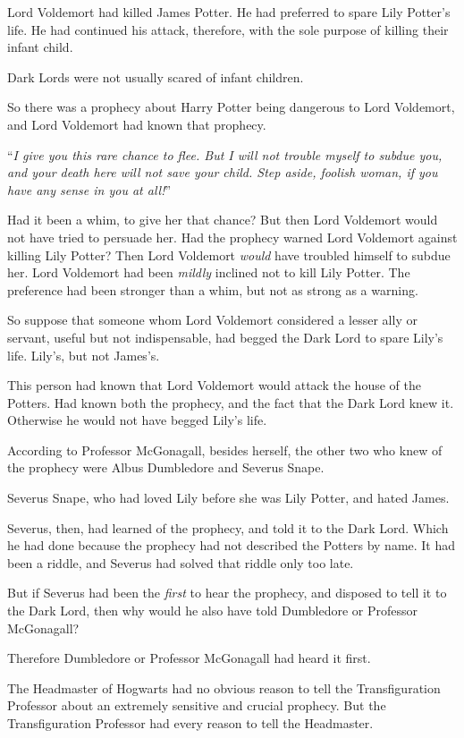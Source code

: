 Lord Voldemort had killed James Potter. He had preferred to spare Lily Potter’s life. He had continued his attack, therefore, with the sole purpose of killing their infant child.

Dark Lords were not usually scared of infant children.

So there was a prophecy about Harry Potter being dangerous to Lord Voldemort, and Lord Voldemort had known that prophecy.

“\emph{I give you this rare chance to flee. But I will not trouble myself to subdue you, and your death here will not save your child. Step aside, foolish woman, if you have any sense in you at all!}”

Had it been a whim, to give her that chance? But then Lord Voldemort would not have tried to persuade her. Had the prophecy warned Lord Voldemort against killing Lily Potter? Then Lord Voldemort \emph{would} have troubled himself to subdue her. Lord Voldemort had been \emph{mildly} inclined not to kill Lily Potter. The preference had been stronger than a whim, but not as strong as a warning.

So suppose that someone whom Lord Voldemort considered a lesser ally or servant, useful but not indispensable, had begged the Dark Lord to spare Lily’s life. Lily’s, but not James’s.

This person had known that Lord Voldemort would attack the house of the Potters. Had known both the prophecy, and the fact that the Dark Lord knew it. Otherwise he would not have begged Lily’s life.

According to Professor McGonagall, besides herself, the other two who knew of the prophecy were Albus Dumbledore and Severus Snape.

Severus Snape, who had loved Lily before she was Lily Potter, and hated James.

Severus, then, had learned of the prophecy, and told it to the Dark Lord. Which he had done because the prophecy had not described the Potters by name. It had been a riddle, and Severus had solved that riddle only too late.

But if Severus had been the \emph{first} to hear the prophecy, and disposed to tell it to the Dark Lord, then why would he also have told Dumbledore or Professor McGonagall?

Therefore Dumbledore or Professor McGonagall had heard it first.

The Headmaster of Hogwarts had no obvious reason to tell the Transfiguration Professor about an extremely sensitive and crucial prophecy. But the Transfiguration Professor had every reason to tell the Headmaster.

